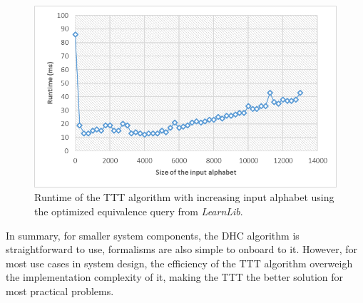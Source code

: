 \begin{figure}[H]
	\centering
	\includegraphics[width=0.7\linewidth]{figures/inputruntimeoptttt}
	\caption{Runtime of the TTT algorithm with increasing input alphabet using the optimized equivalence query from \emph{LearnLib}.}
	\label{fig:inputruntimeoptttt}
\end{figure}

In summary, for smaller system components, the DHC algorithm is straightforward to use, formalisms are also simple to onboard to it. However, for most use cases in system design, the efficiency of the TTT algorithm overweigh the implementation complexity of it, making the TTT the better solution for most practical problems.


